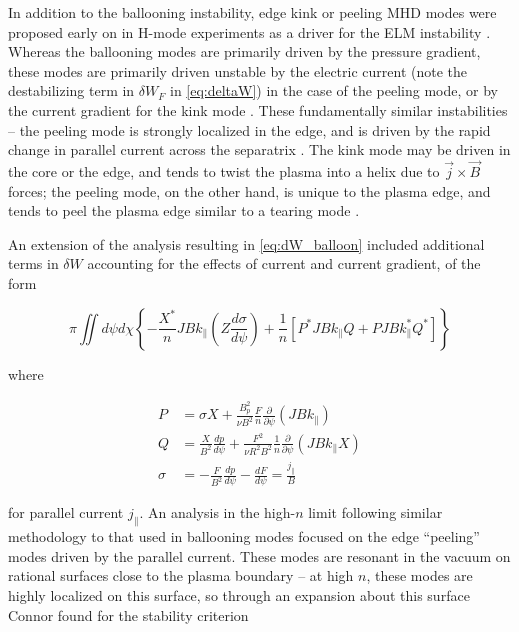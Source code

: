 In addition to the ballooning instability, edge kink or peeling MHD modes were proposed early on in H-mode experiments as a driver for the ELM instability \cite{Keilhacker1984,Zohm1996}.  Whereas the ballooning modes are primarily driven by the pressure gradient, these modes are primarily driven unstable by the electric current (note the destabilizing term in $\delta W_F$ in \cref{eq:deltaW}) in the case of the peeling mode, or by the current gradient for the kink mode \cite{Wilson2006}.  These fundamentally similar instabilities -- the peeling mode is strongly localized in the edge, and is driven by the rapid change in parallel current across the separatrix \cite{Wilson2006,Connor1998a}.  The kink mode may be driven in the core or the edge, and tends to twist the plasma into a helix due to $\vec{j} \times \vec{B}$ forces; the peeling mode, on the other hand, is unique to the plasma edge, and tends to peel the plasma edge similar to a tearing mode \cite{Wilson1999}.

An extension of the analysis resulting in \cref{eq:dW_balloon} \cite{Connor1979} included additional terms in $\delta W$ accounting for the effects of current and current gradient, of the form

\begin{equation}\label{eq:dW_balloon_current}
  \pi \iint d\psi d\chi \left\{ - \frac{X^*}{n} JB k_\parallel \left( Z \frac{d \sigma}{d \psi} \right) + \frac{1}{n} \left[ P^* JB k_\parallel Q + PJBk_\parallel^* Q^* \right] \right\}
\end{equation}

\noindent where

\begin{equation}\label{eq:dW_current_defs}
 \begin{aligned}
  P &= \sigma X + \frac{B_p^2}{\nu B^2} \frac{F}{n} \frac{\partial}{\partial \psi} \left( JBk_\parallel \right)\\
  Q &= \frac{X}{B^2} \frac{dp}{d\psi} + \frac{F^2}{\nu R^2 B^2} \frac{1}{n} \frac{\partial}{\partial \psi} \left( JBk_\parallel X \right)\\
  \sigma &= -\frac{F}{B^2} \frac{dp}{d\psi} - \frac{dF}{d\psi} = \frac{j_\parallel}{B}
 \end{aligned}
\end{equation}

\noindent for parallel current $j_\parallel$.  An analysis in the high-$n$ limit following similar methodology to that used in ballooning modes \cite{Connor1998a} focused on the edge ``peeling'' modes driven by the parallel current.  These modes are resonant in the vacuum on rational surfaces close to the plasma boundary -- at high $n$, these modes are highly localized on this surface, so through an expansion about this surface Connor \etal \cite{Connor1998a} found for the stability criterion

